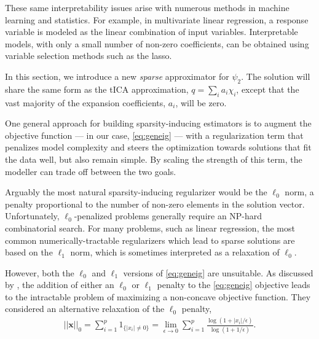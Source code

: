 \documentclass[aip, jcp, reprint, nolinenumbers, twocolumn, nobalancelastpage, nofootinbib]{revtex4-1}
\begin{document}
These same interpretability issues arise with numerous methods in machine learning and statistics. For example, in multivariate linear regression, a response variable is modeled as the linear combination of input variables. Interpretable models, with only a small number of non-zero coefficients, can be obtained using variable selection methods such as the lasso.\cite{tibshirani1996regression}

In this section, we introduce a new \emph{sparse} approximator for $\psi_2$. The solution will share the same form as the tICA approximation, $q = \sum_{i} a_i \chi_i$, except that the vast majority of the expansion coefficients, $a_i$, will be zero.

One general approach for building sparsity-inducing estimators is to augment the objective function --- in our case, \cref{eq:geneig} --- with a regularization term that penalizes model complexity and steers the optimization towards solutions that fit the data well, but also remain simple. By scaling the strength of this term, the modeller can trade off between the two goals.

Arguably the most natural sparsity-inducing regularizer would be the $\ell_0$ norm, a penalty proportional to the number of non-zero elements in the solution vector. Unfortunately, $\ell_0$-penalized problems generally require an NP-hard combinatorial search. For many problems, such as linear regression, the most common numerically-tractable regularizers which lead to sparse solutions are based on the $\ell_1$ norm, which is sometimes interpreted as a relaxation of $\ell_0$.\cite{efron2004least, tropp2006just}

However, both the $\ell_0$ and $\ell_1$ versions of \cref{eq:geneig} are unsuitable. As discussed by \citet{sriperumbudur2011majorization}, the addition of either an $\ell_0$ or $\ell_1$ penalty to the \cref{eq:geneig} objective leads to the intractable problem of maximizing a non-concave objective function. They considered an alternative relaxation of the $\ell_0$ penalty,
\begin{align}
    ||\mathbf{x}||_0 = \sum_{i=1}^p 1_{\{|x_i| \neq 0\}} = \lim_{\epsilon \rightarrow 0} \sum_{i=1}^p \frac{\log(1+|x_i|/\epsilon)}{\log(1+1/\epsilon)}.
\end{align}
\end{document}
